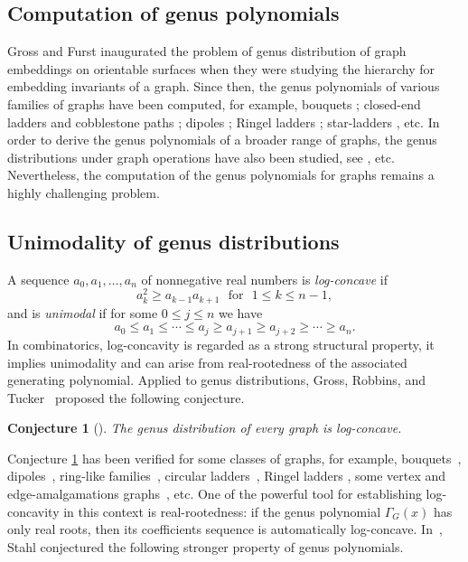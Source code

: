 \documentclass[12pt]{article}
\newtheorem{conjecture}[theorem]{Conjecture}
\theoremstyle{definition}
\begin{document}
\subsection{Computation of genus polynomials}
Gross and Furst \cite{GrossFurst1987} inaugurated the problem of genus
distribution of graph embeddings on orientable surfaces when
they were studying the hierarchy for embedding invariants of a
graph. Since then, the genus polynomials of various families of graphs have been computed, for example, bouquets \cite{GRT89};
closed-end ladders and cobblestone paths \cite{FurstGrossStatman1989}; dipoles \cite{KL93}; Ringel ladders \cite{Tesar2000}; star-ladders \cite{Chen2012a}, etc.
In order to derive the genus polynomials of a broader range of graphs, the genus distributions under graph operations have also been studied, see \cite{Gross2011b, Khan2010, Poshni2012}, etc. Nevertheless, the computation of the genus polynomials for graphs remains a highly challenging problem.


\subsection{Unimodality of genus distributions}
A sequence $a_0,a_1,\dots,a_n$ of nonnegative real numbers is \emph{log-concave} if $$a_k^2 \ge a_{k-1}a_{k+1} ~~~\mbox{for}~~~ 1\le k\le n-1,$$ and is \emph{unimodal} if for some $0\le j\le n$ we have $$a_0\le a_1\le\cdots\le a_j\ge a_{j+1}\ge a_{j+2}\ge\cdots\ge a_n.$$
In combinatorics, log-concavity is regarded as a strong structural property, it implies unimodality and can arise from real-rootedness of the associated generating polynomial. Applied to genus distributions, Gross, Robbins, and Tucker~\cite{GRT89} proposed the following conjecture.

\begin{conjecture}[\cite{GRT89}]\label{c1:1}
The genus distribution of every graph is log-concave.
\end{conjecture}

Conjecture \ref{c1:1} has been verified for some classes of graphs, for example, bouquets~\cite{GRT89}, dipoles~\cite{KL93}, ring-like families~\cite{GMT14}, circular ladders~\cite{Chen15}, Ringel ladders \cite{Gross2015a}, some vertex and edge-amalgamations graphs~\cite{GMTW15}, etc.
One of the powerful tool for establishing log-concavity in this context is real-rootedness: if the genus polynomial $\Gamma_G(x)$ has only real roots, then its coefficients sequence is automatically log-concave.
In~\cite{Stahl}, Stahl conjectured the following stronger property of genus polynomials.
\end{document}
